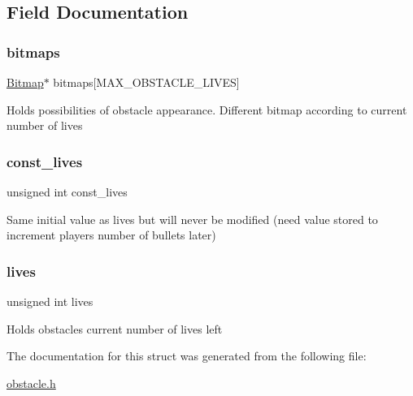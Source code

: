 \subsection{Field Documentation}
\hypertarget{struct_obstacle_ad89799fda86133fec366bb53373d93b8}{}\label{struct_obstacle_ad89799fda86133fec366bb53373d93b8} 
\subsubsection{\texorpdfstring{bitmaps}{bitmaps}}
{\footnotesize\ttfamily \hyperlink{struct_bitmap}{Bitmap}$\ast$ bitmaps\mbox{[}M\+A\+X\+\_\+\+O\+B\+S\+T\+A\+C\+L\+E\+\_\+\+L\+I\+V\+ES\mbox{]}}

Holds possibilities of obstacle appearance. Different bitmap according to current number of lives \hypertarget{struct_obstacle_ab9d581d927d2e11f929ee02052f9eb58}{}\label{struct_obstacle_ab9d581d927d2e11f929ee02052f9eb58} 
\subsubsection{\texorpdfstring{const\+\_\+lives}{const\_lives}}
{\footnotesize\ttfamily unsigned int const\+\_\+lives}

Same initial value as \textquotesingle{}lives\textquotesingle{} but will never be modified (need value stored to increment player\textquotesingle{}s number of bullets later) \hypertarget{struct_obstacle_a5b6f67c2402ab532f12e2422ddd2f5e4}{}\label{struct_obstacle_a5b6f67c2402ab532f12e2422ddd2f5e4} 
\subsubsection{\texorpdfstring{lives}{lives}}
{\footnotesize\ttfamily unsigned int lives}

Holds obstacle\textquotesingle{}s current number of lives left 

The documentation for this struct was generated from the following file\+:\begin{DoxyCompactItemize}
\item 
\hyperlink{obstacle_8h}{obstacle.\+h}\end{DoxyCompactItemize}
